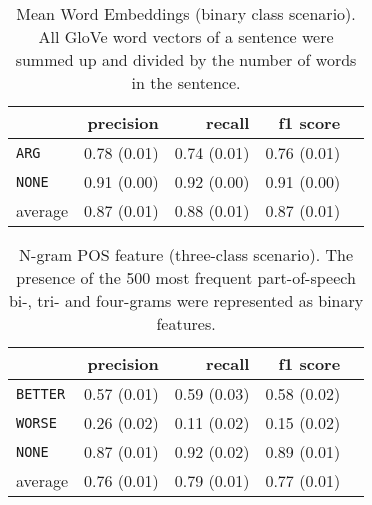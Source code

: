 	\begin{table}[h] 
		\centering 
		\caption{Mean Word Embeddings (binary class scenario). All GloVe word vectors of a sentence were summed up and divided by the number of words in the sentence.} 
		\label{  }
		\begin{tabular}{@{}lrrrr@{}}
			\toprule
			        & precision                & recall                   & f1 score                 \\ \midrule 
			\texttt{ARG}     & 0.78 \scriptsize{(0.01)} & 0.74 \scriptsize{(0.01)} & 0.76 \scriptsize{(0.01)} \\ 
			\texttt{NONE}    & 0.91 \scriptsize{(0.00)} & 0.92 \scriptsize{(0.00)} & 0.91 \scriptsize{(0.00)} \\ 
			average & 0.87 \scriptsize{(0.01)} & 0.88 \scriptsize{(0.01)} & 0.87 \scriptsize{(0.01)} \\ 
			\bottomrule
		\end{tabular}
	\end{table}
	

	\begin{table}[h] 
		\centering 
		\caption{N-gram POS feature (three-class scenario). The presence of the 500 most frequent part-of-speech bi-, tri- and four-grams were represented as binary features.} 
		\label{  }
		\begin{tabular}{@{}lrrrr@{}}
			\toprule
			        & precision                & recall                   & f1 score                 \\ \midrule 
			\texttt{BETTER}  & 0.57 \scriptsize{(0.01)} & 0.59 \scriptsize{(0.03)} & 0.58 \scriptsize{(0.02)} \\ 
			\texttt{WORSE}   & 0.26 \scriptsize{(0.02)} & 0.11 \scriptsize{(0.02)} & 0.15 \scriptsize{(0.02)} \\ 
			\texttt{NONE}    & 0.87 \scriptsize{(0.01)} & 0.92 \scriptsize{(0.02)} & 0.89 \scriptsize{(0.01)} \\ 
			average & 0.76 \scriptsize{(0.01)} & 0.79 \scriptsize{(0.01)} & 0.77 \scriptsize{(0.01)} \\ 
			\bottomrule
		\end{tabular}
	\end{table}
	
